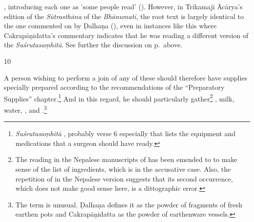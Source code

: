 \begin{translation}
{            \citep[128–129]{acar-1939}, introducing each one as 'some people read' (). However,  in Trikamajī Ācārya's edition of the \emph{Sūtrasthāna}
            of the \emph{Bhānumatī}, the root text is largely identical to the one commented
            on by Ḍalhaṇa (\cite{vulgate}), even in instances like this where Cakrapāṇidatta's
            commentary indicates that he was reading a different version of the
            \emph{Suśrutasaṃhitā}. See further the discussion on p.\,\pageref{skinflap}
            above.} 
            \item[10]
    
A person wishing to perform a join of any of these should therefore have supplies
specially prepared according to the recommendations of the “Preparatory Supplies”
chapter.\footnote{\emph{Suśrutasaṃhitā} , probably verse 6
    especially that lists the equipment and medications that a surgeon should have
    ready.}  And in this regard, he should particularly gather\footnote{The reading in
        the Nepalese manuscripts of  has been emended to
         to make sense of the list of ingredients, which is
        in the accusative case. Also, the repetition of  in the
        Nepalese version suggests that its second occurrence, which does not make good
        sense here, is a dittographic error.} , milk,
        water, , and 
        .\footnote{The term  is unusual. Ḍalhaṇa
            \citep[79]{vulgate} defines it as the powder of fragments of fresh earthen pots
            and Cakrapāṇidatta \citep[129]{acar-1939} as the powder of earthenware vessels.}
    

\end{translation}
